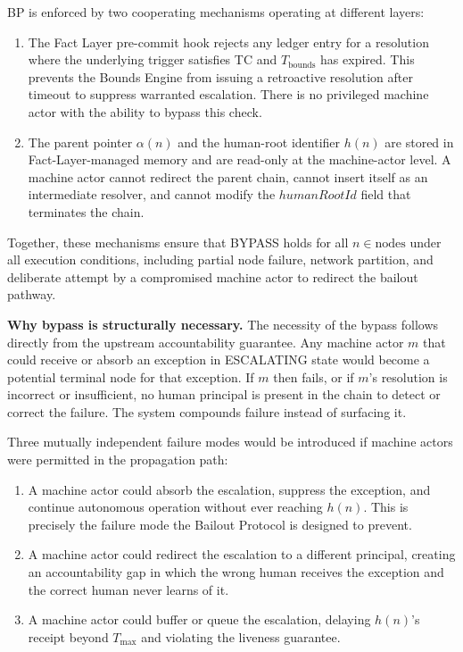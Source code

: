 BP is enforced by two cooperating mechanisms operating at different layers:

\begin{enumerate}\itemsep=0pt
\item[\textbf{Fact Layer gate.}] The Fact Layer pre-commit hook rejects any ledger entry for a resolution where the underlying trigger satisfies TC and $T_{\text{bounds}}$ has expired. This prevents the Bounds Engine from issuing a retroactive resolution after timeout to suppress warranted escalation. There is no privileged machine actor with the ability to bypass this check.

\item[\textbf{Immutable parent-pointer and human-root architecture.}] The parent pointer $\alpha(n)$ and the human-root identifier $h(n)$ are stored in Fact-Layer-managed memory and are read-only at the machine-actor level. A machine actor cannot redirect the parent chain, cannot insert itself as an intermediate resolver, and cannot modify the $humanRootId$ field that terminates the chain.
\end{enumerate}

Together, these mechanisms ensure that BYPASS holds for all $n \in \text{nodes}$ under all execution conditions, including partial node failure, network partition, and deliberate attempt by a compromised machine actor to redirect the bailout pathway.

\bigskip
\noindent\textbf{Why bypass is structurally necessary.} The necessity of the bypass follows directly from the upstream accountability guarantee. Any machine actor $m$ that could receive or absorb an exception in ESCALATING state would become a potential terminal node for that exception. If $m$ then fails, or if $m$'s resolution is incorrect or insufficient, no human principal is present in the chain to detect or correct the failure. The system compounds failure instead of surfacing it.

Three mutually independent failure modes would be introduced if machine actors were permitted in the propagation path:

\begin{enumerate}
\item[\textbf{Intercept.}] A machine actor could absorb the escalation, suppress the exception, and continue autonomous operation without ever reaching $h(n)$. This is precisely the failure mode the Bailout Protocol is designed to prevent.

\item[\textbf{Redirect.}] A machine actor could redirect the escalation to a different principal, creating an accountability gap in which the wrong human receives the exception and the correct human never learns of it.

\item[\textbf{Delay.}] A machine actor could buffer or queue the escalation, delaying $h(n)$'s receipt beyond $T_{\text{max}}$ and violating the liveness guarantee.
\end{enumerate}

